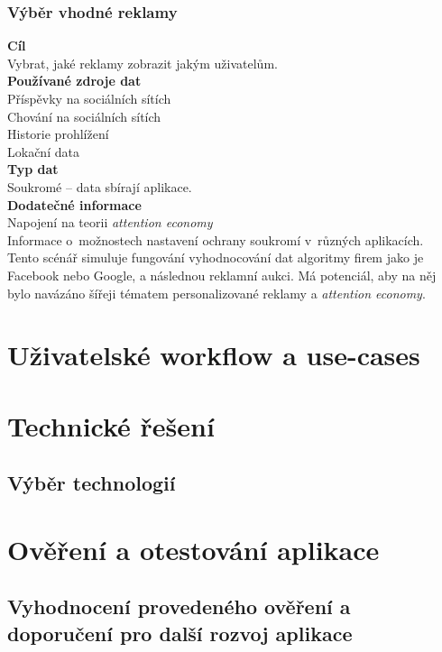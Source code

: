 \subsubsection*{Výběr vhodné reklamy} 

\textbf{Cíl}\\
Vybrat, jaké reklamy zobrazit jakým uživatelům.\\
\textbf{Používané zdroje dat}\\
Příspěvky na sociálních sítích\\
Chování na sociálních sítích\\
Historie prohlížení\\
Lokační data\\
\textbf{Typ dat}\\
Soukromé -- data sbírají aplikace.\\
\textbf{Dodatečné informace}\\
Napojení na teorii \textit{attention economy}\\
Informace o~možnostech nastavení ochrany soukromí v~různých aplikacích.\\

Tento scénář simuluje fungování vyhodnocování dat algoritmy firem jako je Facebook nebo Google, a následnou reklamní aukci. Má potenciál, aby na něj bylo navázáno šířeji tématem personalizované reklamy a \textit{attention economy}. 

\section{Uživatelské workflow a use-cases}

\section{Technické řešení}
\subsection{Výběr technologií}

\section{Ověření a otestování aplikace}
\subsection{Vyhodnocení provedeného ověření a doporučení pro další rozvoj aplikace}
